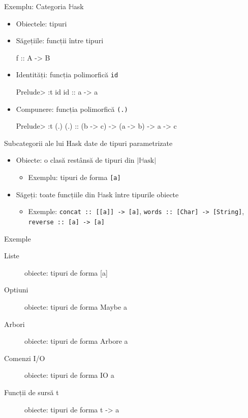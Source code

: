 \documentclass[xcolor=pdftex,romanian,colorlinks]{beamer}
\begin{document}
\begin{frame}[fragile]{Exemplu: Categoria $\mathbb{H}$ask}
\begin{itemize}
\item Obiectele: tipuri
\item Săgețiile: funcții între tipuri
\begin{asciihs}
f :: A -> B
\end{asciihs}
\item Identități: funcția polimorfică \lstinline$id$
\begin{asciihs}
Prelude> :t id
id :: a -> a
\end{asciihs}
\item Compunere: funcția polimorfică \lstinline$(.)$
\begin{asciihs}
Prelude> :t (.)
(.) :: (b -> c) -> (a -> b) -> a -> c
\end{asciihs}
\end{itemize}
\end{frame}

\begin{frame}[fragile]{Subcategorii ale lui Hask date de tipuri parametrizate}
\begin{itemize}
\item Obiecte: o clasă restânsă de tipuri din $|\mathbb{H}\textrm{ask}|$
\begin{itemize}
\item Exemplu: tipuri de forma \lstinline$[a]$
\end{itemize}
\item Săgeți: toate funcțiile din $\mathbb{H}$ask între tipurile obiecte
\begin{itemize}
\item Exemple: \lstinline$concat :: [[a]] -> [a]$, \lstinline$words :: [Char] -> [String]$, \lstinline$reverse :: [a] -> [a]$
\end{itemize}
\end{itemize}

\begin{block}{Exemple}
\begin{description}
\item[Liste] obiecte: tipuri de forma [a]
\item[Optiuni] obiecte: tipuri de forma Maybe a
\item[Arbori] obiecte: tipuri de forma Arbore a
\item[Comenzi I/O] obiecte: tipuri de forma IO a
\item[Funcții de sursă t] obiecte: tipuri de forma t -> a

\end{description}
\end{block}
\end{frame}
\end{document}
